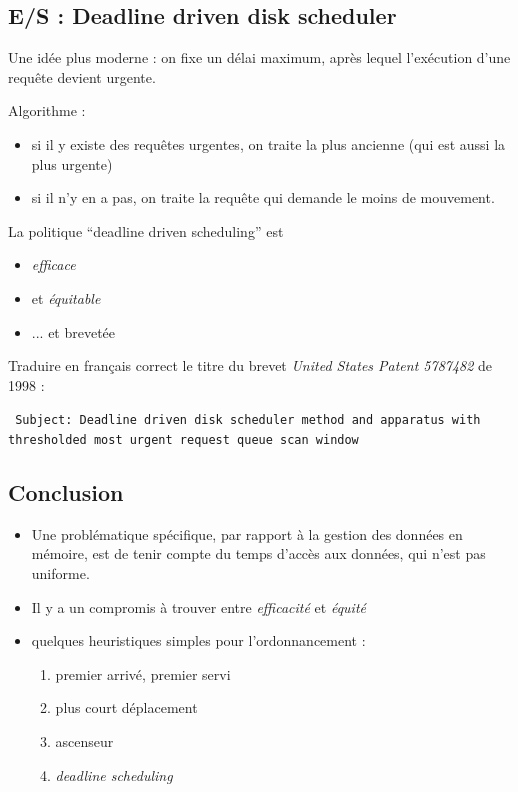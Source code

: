 \begin{multicols}{2}
\subsection{E/S : Deadline driven disk scheduler}


Une idée plus moderne :  on fixe un délai maximum, après lequel
l'exécution d'une requête devient urgente.

Algorithme :
\begin{itemize}
\item si il y existe des requêtes urgentes, on traite la plus ancienne
(qui est aussi la plus urgente)
\item si il n'y en a pas, on traite la requête qui demande le moins de
  mouvement.
\end{itemize}

La politique ``deadline driven scheduling'' est
\begin{itemize}
 \item \emph{efficace}
 \item et \emph{équitable}
  \item ... et brevetée
\end{itemize}

\begin{exercice}
Traduire en français correct le titre du brevet \emph{United States Patent 5787482} de 1998 :

\texttt{
Subject: Deadline driven disk scheduler method and
  apparatus with thresholded most urgent request queue scan window}
\end{exercice}


\subsection{Conclusion}
\begin{itemize}
\item Une problématique spécifique, par rapport à la gestion des données en mémoire, est de tenir compte du temps d'accès aux données, qui n'est pas
uniforme.
\item   Il y a un compromis à trouver entre 
\emph{efficacité}
et \emph{équité}
\item  quelques heuristiques simples pour l'ordonnancement :
\begin{enumerate}
\item premier arrivé, premier servi
\item plus court déplacement
\item ascenseur
\item \emph{deadline scheduling}
\end{enumerate}
\end{itemize}




\end{multicols}
